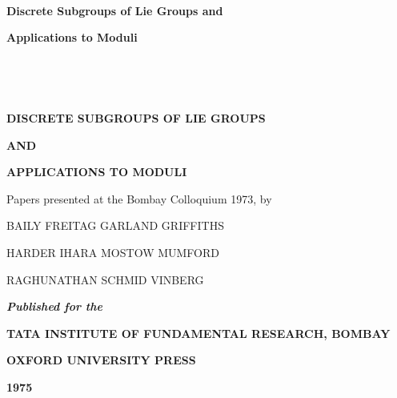 ~\vfill

\begin{center}
{\Large\bf Discrete Subgroups of Lie Groups and}
\medskip

\thispagestyle{empty}

{\Large\bf Applications to Moduli}
\end{center}

\vfill\eject

~\phantom{a}
\thispagestyle{empty}

\vfill\eject


\thispagestyle{empty}

~

\begin{center}
{\Large\bf DISCRETE SUBGROUPS OF LIE GROUPS}
\medskip

{\Large\bf AND}

\medskip
\thispagestyle{empty}

{\Large\bf APPLICATIONS TO MODULI}
\end{center}

\vskip 1cm

\begin{center}
Papers presented at the Bombay Colloquium 1973, by
\end{center}

\smallskip

\begin{center}
BAILY FREITAG GARLAND GRIFFITHS

HARDER IHARA MOSTOW MUMFORD

RAGHUNATHAN SCHMID VINBERG        
\vfill

{\bf\em Published for the}
\medskip

{\large\bf TATA INSTITUTE OF FUNDAMENTAL RESEARCH, BOMBAY}

\medskip

{\large\bf OXFORD UNIVERSITY PRESS}

\smallskip

{\bf 1975}
\end{center}


\newpage

~\phantom{a}

\thispagestyle{empty}


